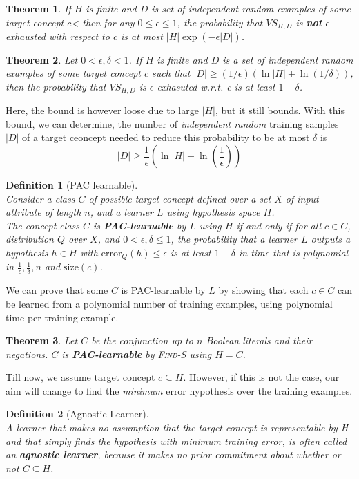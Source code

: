 \documentclass[12pt]{article}
\newtheorem{definition}{Definition}[section]
\newtheorem{theorem}{Theorem}[section]
\theoremstyle{definition}
\begin{document}
\begin{theorem}\normalfont If $H$ is finite and $D$ is set of independent random examples of some target concept $c$< then for any $0\leq \epsilon\leq 1$, the probability that $VS_{H,D}$ is \textbf{not} $\epsilon$-exhausted with respect to $c$ is at most $|H|\exp(-\epsilon|D|)$.
\end{theorem}
\begin{theorem}\normalfont Let $0<\epsilon, \delta<1$. If $H$ is finite and $D$ is a set of independent random examples of some target concept $c$ such that $|D| \geq (1/\epsilon)(\ln|H| +\ln(1/\delta))$, then the probability that $VS_{H,D}$ is $\epsilon$-exhasuted w.r.t. c is at least $1-\delta$.
\end{theorem}
Here, the bound is however loose due to large $|H|$, but it still bounds. With this bound, we can determine, the number of \textit{independent random} training samples $|D|$ of a target ceoncept needed to reduce this probability to be at most $\delta$ is
\[
|D|\geq \frac{1}{\epsilon}(\ln |H|+\ln(\frac{1}{\epsilon}))
\]
\begin{definition}[PAC learnable]
\hfill\\\normalfont Consider a class $C$ of possible target concept defined over a set $X$ of input attribute of length $n$, and a learner $L$ using hypothesis space $H$. \\
The concept class $C$ is \textbf{PAC-learnable} by $L$ using $H$ \textit{if and only if} for all $c\in C$, distribution $Q$ over $X$, and $0<\epsilon, \delta\leq 1$, the probability that a learner $L$ outputs a hypothesis $h\in H$ with $\text{error}_Q(h)\leq \epsilon$ is at least $1-\delta$ in time that is polynomial in $\frac{1}{\epsilon}, \frac{1}{\delta}, n$ and $\text{size}(c)$.
\end{definition}
We can prove that some $C$ is PAC-learnable by $L$ by showing that each $c\in C$ can be learned from a polynomial number of training examples, using polynomial time per training example.
\begin{theorem}\normalfont Let $C$ be the conjunction up to $n$ Boolean literals and their negations. $C$ is \textbf{PAC-learnable} by \textsc{Find-S} using $H=C$.
\end{theorem}
Till now, we assume target concept $c\subseteq H$. However, if this is not the case, our aim will change to find the \textit{minimum} error hypothesis over the training examples.
\begin{definition}[Agnostic Learner]
\hfill\\\normalfont A learner that makes no assumption that the target concept is representable by H and that simply finds the hypothesis with minimum training error, is often called an \textbf{agnostic learner}, because it makes no prior commitment about whether or not $C\subseteq H$.
\end{definition}
\end{document}
